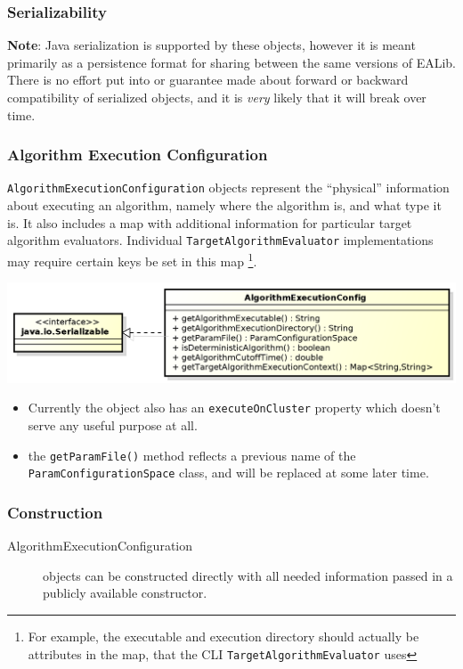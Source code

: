 \documentclass[11pt,letterpaper,oneside]{article}
\begin{document}
\subsubsection{Serializability}

\textbf{Note}: Java serialization is supported by these objects, however it is meant primarily as a persistence format for sharing between the same versions of EALib. There is no effort put into or guarantee made about forward or backward compatibility of serialized objects, and it is \emph{very} likely that it will break over time.


\subsubsection{Algorithm Execution Configuration}

\texttt{AlgorithmExecutionConfiguration} objects represent the ``physical'' information about executing an algorithm, namely where the algorithm is, and what type it is. It also includes a map with additional information for particular target algorithm evaluators. Individual \texttt{TargetAlgorithmEvaluator} implementations may require certain keys be set in this map \footnote{For example, the executable and execution directory should actually be attributes in the map, that the CLI \texttt{TargetAlgorithmEvaluator} uses}. 

\begin{center}
\includegraphics[scale=0.75]{img/UML/ExecConfig.png}
\end{center}

\begin{itemize}
\item Currently the object also has an \texttt{executeOnCluster} property which doesn't serve any useful purpose at all.
\item the \texttt{getParamFile()} method reflects a previous name of the \texttt{ParamConfigurationSpace} class, and will be replaced at some later time.
\end{itemize}

\subsubsection{Construction}
\begin{description}
\item[AlgorithmExecutionConfiguration] objects can be constructed directly with all needed information passed in a publicly available constructor.
\end{description}
\end{document}
